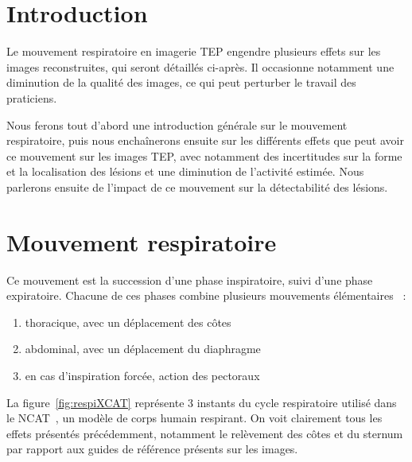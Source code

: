 \section{Introduction}

Le mouvement respiratoire en imagerie TEP engendre plusieurs effets sur les images reconstruites, qui seront détaillés ci-après. Il occasionne notamment une diminution de la qualité des images, ce qui peut perturber le travail des praticiens. 

Nous ferons tout d'abord une introduction générale sur le mouvement respiratoire, puis nous enchaînerons ensuite sur les différents effets que peut avoir ce mouvement sur les images TEP, avec notamment des incertitudes sur la forme et la localisation des lésions et une diminution de l'activité estimée. Nous parlerons ensuite de l'impact de ce mouvement sur la détectabilité des lésions.

\section{Mouvement respiratoire}

Ce mouvement est la succession d'une phase inspiratoire, suivi d'une phase expiratoire. Chacune de ces phases combine plusieurs mouvements élémentaires~\cite{servant2007cours} :
 
\begin{enumerate}
 \item thoracique, avec un déplacement des côtes
 \item abdominal, avec un déplacement du diaphragme
 \item en cas d'inspiration forcée, action des pectoraux
\end{enumerate}

La figure~\ref{fig:respiXCAT} représente 3 instants du cycle respiratoire utilisé dans le NCAT~\cite{segars2001These}, un modèle de corps humain respirant. On voit clairement tous les effets présentés précédemment, notamment le relèvement des côtes et du sternum par rapport aux guides de référence  présents sur les images.


